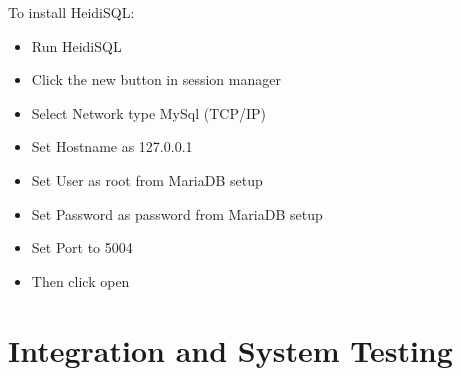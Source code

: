  To install HeidiSQL:\newline
\begin{itemize}
\item Run HeidiSQL
\item Click the new button in session manager
\item Select Network type MySql (TCP/IP)
\item Set Hostname as 127.0.0.1
\item Set User as root from MariaDB setup 
\item Set Password as password from MariaDB setup 
\item Set Port to 5004 
\item Then click open
\end{itemize}
\newpage
\section{Integration and System Testing}
